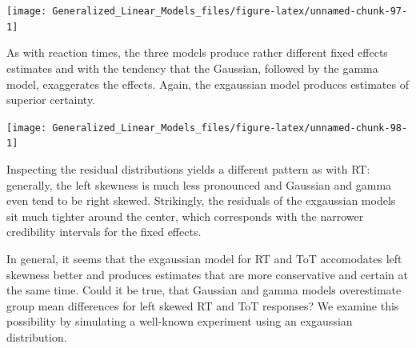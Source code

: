 \documentclass[]{svmono}
\newenvironment{Shaded}{\begin{snugshade}}{\end{snugshade}}
\newcommand{\KeywordTok}[1]{\textcolor[rgb]{0.13,0.29,0.53}{\textbf{#1}}}
\newcommand{\DataTypeTok}[1]{\textcolor[rgb]{0.13,0.29,0.53}{#1}}
\newcommand{\DecValTok}[1]{\textcolor[rgb]{0.00,0.00,0.81}{#1}}
\newcommand{\StringTok}[1]{\textcolor[rgb]{0.31,0.60,0.02}{#1}}
\newcommand{\OperatorTok}[1]{\textcolor[rgb]{0.81,0.36,0.00}{\textbf{#1}}}
\newcommand{\NormalTok}[1]{#1}
\begin{document}
\texttt{[image: Generalized\_Linear\_Models\_files/figure-latex/unnamed-chunk-97-1]}

As with reaction times, the three models produce rather different fixed
effects estimates and with the tendency that the Gaussian, followed by
the gamma model, exaggerates the effects. Again, the exgaussian model
produces estimates of superior certainty.

\begin{Shaded}
\end{Shaded}

\texttt{[image: Generalized\_Linear\_Models\_files/figure-latex/unnamed-chunk-98-1]}

Inspecting the residual distributions yields a different pattern as with
RT: generally, the left skewness is much less pronounced and Gaussian
and gamma even tend to be right skewed. Strikingly, the residuals of the
exgaussian models sit much tighter around the center, which corresponds
with the narrower credibility intervals for the fixed effects.

In general, it seems that the exgaussian model for RT and ToT
accomodates left skewness better and produces estimates that are more
conservative and certain at the same time. Could it be true, that
Gaussian and gamma models overestimate group mean differences for left
skewed RT and ToT responses? We examine this possibility by simulating a
well-known experiment using an exgaussian distribution.
\end{document}

